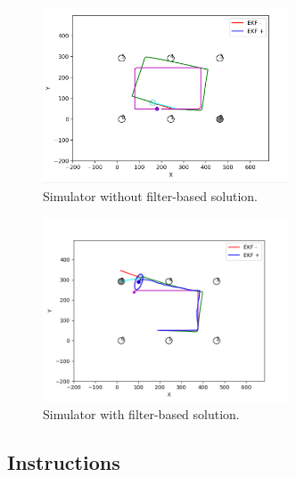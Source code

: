 \documentclass[11pt, oneside, letterpaper]{article}
\begin{document}
\begin{figure}[h]%
	\centering%
	\includegraphics[width=0.65\textwidth]{./figures/specs/simulator_no_filter.png}%
	\caption{Simulator without filter-based solution.}%
	\label{F:simulator_no_filter}%
\end{figure}


\begin{figure}[h]%
  \centering%
  \includegraphics[width=0.65\textwidth]{./figures/specs/simulator.png}%
  \caption{Simulator with filter-based solution.}%
  \label{F:simulator}%
\end{figure}

\subsection*{Instructions}
\end{document}
